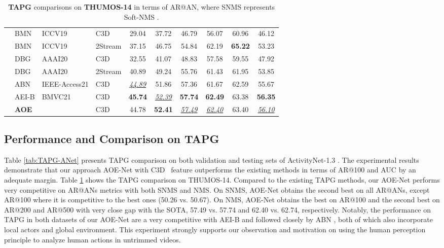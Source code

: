 \documentclass[sn-mathphys]{sn-jnl}
\theoremstyle{thmstyleone}\newtheorem{theorem}{Theorem}\newtheorem{proposition}[theorem]{Proposition}
\theoremstyle{thmstyletwo}\newtheorem{example}{Example}\newtheorem{remark}{Remark}
\theoremstyle{thmstylethree}\newtheorem{definition}{Definition}
\begin{document}
\begin{table}[!tb]
{\begin{tabular}{c|lll|ccccc|c}
& BMN\cite{bmn} & ICCV19 & C3D & 29.04 & 37.72 & 46.79 & 56.07 & 60.96 & 46.12 \\
& BMN\cite{bmn} & ICCV19 & 2Stream & 37.15 & 46.75 & 54.84 & 62.19 & \textbf{65.22} & 53.23 \\
& DBG\cite{dbg} & AAAI20 & C3D & 32.55 & 41.07 & 48.83 & 57.58 & 59.55 & 47.92 \\
& DBG\cite{dbg} & AAAI20 & 2Stream & 40.89 & 49.24 & 55.76 & 61.43 & 61.95 & 53.85 \\
& ABN\cite{KhoaVo_Access} & IEEE-Access21 & C3D & \underline{\textit{44.89}} & 51.86 & 57.36 & 61.67 & 62.59 & 55.67 \\
& AEI-B \cite{khoavo_aei_bmvc21} & BMVC21 & C3D & \textbf{45.74} & \underline{\textit{52.39}} & \textbf{57.74} & \textbf{62.49} & 63.38 & \textbf{56.35} \\
\cline{2-10}
& \textbf{AOE} & & C3D & 44.78 & \textbf{52.41} & \underline{\textit{57.49}} & \underline{\textit{62.40}} & 63.40 & \underline{\textit{56.10}} \\
\bottomrule
\end{tabular}
}
\caption{\textbf{TAPG} comparisons on \textbf{THUMOS-14} in terms of AR@AN, where SNMS represents Soft-NMS \cite{SoftNMS}.} \label{tab:TAPG-Thumos}
\end{table}

\subsection{Performance and Comparison on TAPG}

Table \ref{tab:TAPG-ANet} presents TAPG comparison on both validation and testing sets of ActivityNet-1.3 \cite{caba2015activitynet}. The experimental results demonstrate that our approach AOE-Net with C3D~\cite{C3D} feature outperforms the existing methods in terms of AR@100 and AUC by an adequate margin. Table \ref{tab:TAPG-Thumos} shows the TAPG comparison on THUMOS-14. Compared to the existing TAPG methods, our AOE-Net performs very competitive on AR@ANs metrics with both SNMS and NMS. On SNMS, AOE-Net obtains the second best on all AR@ANs, except AR@100 where it is competitive to the best ones (50.26 vs. 50.67). On NMS, AOE-Net obtains the best on AR@100 and the second best on AR@200 and AR@500 with very close gap with the SOTA, 57.49 vs. 57.74 and 62.40 vs. 62.74, respectively. Notably, the performance on TAPG in both datasets of our AOE-Net are a very competitive with AEI-B \cite{khoavo_aei_bmvc21} and followed closely by ABN \cite{KhoaVo_Access}, both of which also incorporate local actors and global environment. This experiment strongly supports our observation and motivation on using the human perception principle to analyze human actions in untrimmed videos.
\end{document}
